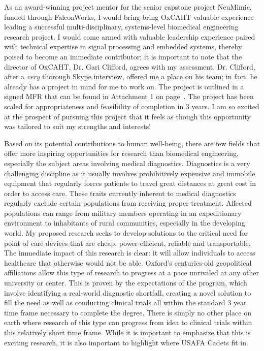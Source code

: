 \documentclass{article}
\begin{document}
As an award-winning project mentor for the senior capstone project
NeuMimic, funded through FalconWorks, I would bring bring OxCAHT valuable experience leading a
successful multi-disciplinary, systems-level biomedical engineering research project. I would 
come armed with valuable leadership experience paired with technical expertise in signal 
processing and embedded systems, thereby poised to become an immediate contributor;
it is important to note that the director of OxCAHT, Dr. Gari Clifford, agrees
with my assessment. Dr. Clifford, after a \emph{very} thorough Skype interview,
offered me a place on his team; in fact, he already has a project in mind for me to work on. 
The project is outlined in a signed MFR that can be found in Attachment 1
on page~\pageref{sec:prop}. The project has been scaled for appropriateness and feasibility of
completion in 3 years. I am so excited at the prospect of pursuing this project that it feels as though this opportunity was tailored to suit my strengths and interests! 
 
Based on its potential contributions to human well-being, there are few fields
that offer more inspiring opportunities for research than biomedical engineering, especially the subject areas involving medical diagnostics.
Diagnostics is a very challenging discipline as it usually involves
prohibitively expensive and immobile equipment that regularly forces patients
to travel great distances at great cost in order to access care. These traits
currently inherent to medical diagnostics regularly exclude certain
populations from receiving proper
treatment. Affected populations can range from military members operating in an
expeditionary environment to inhabitants of rural communities, especially in the developing
world. My proposed research seeks to develop solutions to the critical need for
point of care devices that are cheap, power-efficient, reliable and
transportable. The immediate impact of this research is clear: it will allow
individuals to access healthcare that otherwise would not be able. Oxford's
centuries-old geopolitical affiliations allow this type of research to progress 
at a pace unrivaled at any other university or center. This is proven by the
expectations of the program, which involve identifying a real-world diagnostic 
shortfall, creating a novel solution to fill the need as well as conducting
clinical trials all within the standard 3 year time frame necessary to 
complete the degree. There is simply no other place on earth where research of
this type can progress from idea to clinical trials within this relatively short
time frame. While it is important to emphasize that this is exciting research,
it is also important to highlight where USAFA Cadets fit in.
 
\end{document}

